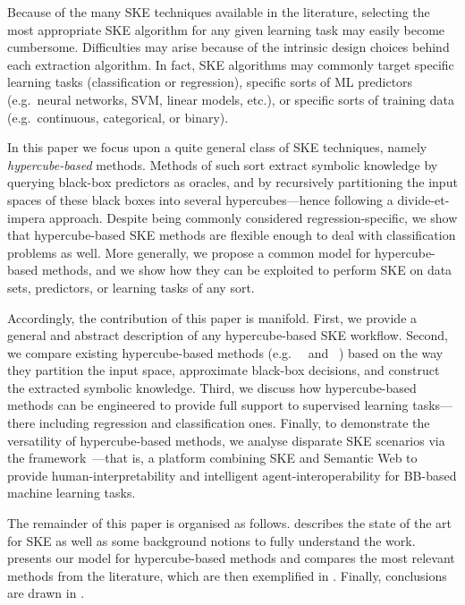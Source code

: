 \documentclass[
]{ceurart}
\begin{document}
Because of the many SKE techniques available in the literature, selecting the most appropriate SKE algorithm for any given learning task may easily become cumbersome.
%
Difficulties may arise because of the intrinsic design choices behind each extraction algorithm.
%
In fact, SKE algorithms may commonly target specific learning tasks (classification or regression), specific sorts of ML predictors (e.g.\ neural networks, SVM, linear models, etc.), or specific sorts of training data (e.g.\ continuous, categorical, or binary).

In this paper we focus upon a quite general class of SKE techniques, namely \emph{hypercube-based} methods.
%
Methods of such sort extract symbolic knowledge by querying black-box predictors as oracles, and by recursively partitioning the input spaces of these black boxes into several hypercubes---hence following a divide-et-impera approach.
%
Despite being commonly considered regression-specific, we show that hypercube-based SKE methods are flexible enough to deal with classification problems as well.
%
More generally, we propose a common model for hypercube-based methods, and we show how they can be exploited to perform SKE on data sets, predictors, or learning tasks of any sort.

Accordingly, the contribution of this paper is manifold.
%
First, we provide a general and abstract description of any hypercube-based SKE workflow.
%
Second, we compare existing hypercube-based methods (e.g.\ \iter{}~\cite{huysmans2006iter} and \gridex{}~\cite{gridex-extraamas2021}) based on the way they partition the input space, approximate black-box decisions, and construct the extracted symbolic knowledge.
%
Third, we discuss how hypercube-based methods can be engineered to provide full support to supervised learning tasks---there including regression and classification ones.
%
Finally, to demonstrate the versatility of hypercube-based methods, we analyse disparate SKE scenarios via the \psyke{} framework~\cite{psyke-woa2021,psyke-ia2022,psyke-extraamas2022}---that is, a platform combining SKE and Semantic Web to provide human-interpretability and intelligent agent-interoperability for BB-based machine learning tasks.

The remainder of this paper is organised as follows.
%
 describes the state of the art for SKE as well as some background notions to fully understand the work.
%
 presents our model for hypercube-based methods and compares the most relevant methods from the literature, which are then exemplified in .
%
Finally, conclusions are drawn in .
\end{document}
